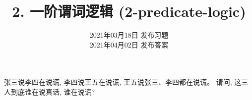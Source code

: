 \documentclass[a4paper, justified]{tufte-handout}
\title{2. 一阶谓词逻辑 (2-predicate-logic)}
\date{2021年03月18日 发布习题 \\ 2021年04月02日 发布答案}
\begin{document}
\maketitle
\noplagiarism %
\begin{abstract}
\end{abstract}
\beginrequired

\begin{problem}
  张三说李四在说谎, 李四说王五在说谎, 王五说张三、李四都在说谎。
  请问, 这三人到底谁在说真话, 谁在说谎?
\end{problem}
\end{document}
